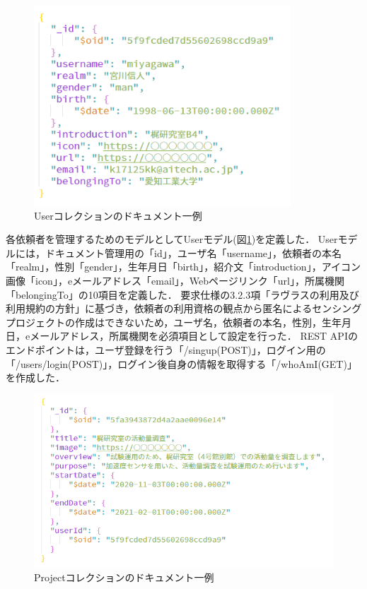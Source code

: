 \begin{figure}[H]
  \centering
  \includegraphics[width=96mm]{User.png}
  \caption{Userコレクションのドキュメント一例}
  \label{User}
\end{figure}

各依頼者を管理するためのモデルとしてUserモデル(図\ref{User})を定義した．
Userモデルには，ドキュメント管理用の「id」，ユーザ名「username」，依頼者の本名「realm」，性別「gender」，生年月日「birth」，紹介文「introduction」，アイコン画像「icon」，eメールアドレス「email」，Webページリンク「url」，所属機関「belongingTo」の10項目を定義した．
要求仕様の3.2.3項「ラヴラスの利用及び利用規約の方針」に基づき，依頼者の利用資格の観点から匿名によるセンシングプロジェクトの作成はできないため，ユーザ名，依頼者の本名，性別，生年月日，eメールアドレス，所属機関を必須項目として設定を行った．
REST APIのエンドポイントは，ユーザ登録を行う「/singup(POST)」，ログイン用の「/users/login(POST)」，ログイン後自身の情報を取得する「/whoAmI(GET)」を作成した．

\begin{figure}[H]
  \centering
  \includegraphics[width=120mm]{Project.png}
  \caption{Projectコレクションのドキュメント一例}
  \label{Project}
\end{figure}

